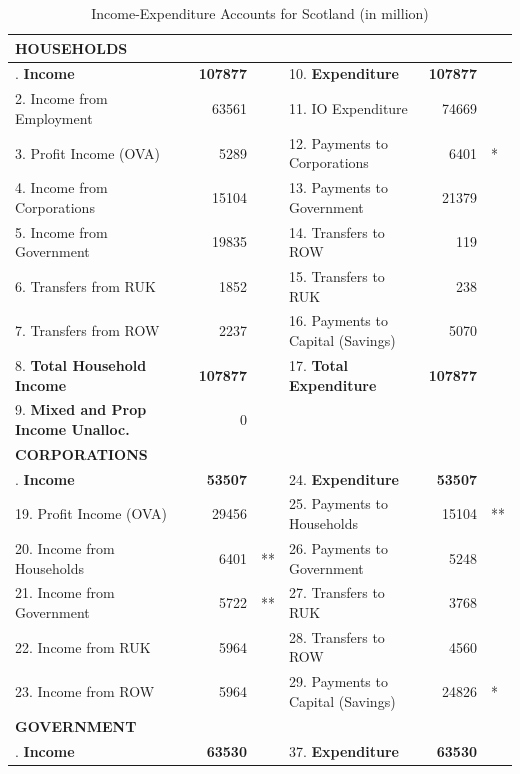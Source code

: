 \begin{table}[H] \caption{Income-Expenditure Accounts for Scotland (in \textsterling million)}
\bigskip \begin{scriptsize} \begin{centering} \begin{spacing}{1.2}
    \begin{tabular}{lrllrl}
          \toprule
    \textbf{HOUSEHOLDS} \bigstrut\\
   \hline  
\bigstrut[t]    1. \textbf{Income} & \textbf{107877} & & 10. \textbf{Expenditure} & \textbf{107877} & \\
    2. Income from Employment & 63561  &   & 11. IO Expenditure & 74669 & \\
    3. Profit Income (OVA) & 5289 & & 12. Payments to Corporations & 6401 &* \\
    4. Income from Corporations & 15104 & & 13. Payments to Government & 21379 & \\
    5. Income from Government & 19835 & & 14. Transfers to ROW & 119 & \\
    6. Transfers from RUK & 1852 & & 15. Transfers to RUK & 238 & \\
    7. Transfers from ROW & 2237 & & 16. Payments to Capital (Savings) & 5070 &\\
    8. \textbf{Total Household Income} & \textbf{107877} & & 17. \textbf{Total Expenditure} & \textbf{107877} & \\
    9. \textbf{Mixed and Prop Income Unalloc.} & 0 & \bigstrut[b]\\
    \hline
\bigstrut[t]    \textbf{CORPORATIONS} \bigstrut\\
    \hline
\bigstrut[t] 18. \textbf{Income} & \textbf{53507}  &   & 24. \textbf{Expenditure} & \textbf{53507} & \\
       19. Profit Income (OVA) & 29456 & & 25. Payments to Households & 15104 &** \\
       20. Income from Households & 6401 &** & 26. Payments to Government & 5248 & \\
       21. Income from Government & 5722 &** & 27. Transfers to RUK & 3768 & \\
       22. Income from RUK & 5964 & & 28. Transfers to ROW & 4560 & \\
       23. Income from ROW & 5964 & & 29. Payments to Capital (Savings) & 24826 &* \\
    \hline
    \textbf{GOVERNMENT} \bigstrut\\
    \hline
\bigstrut[t]       30. \textbf{Income} & \textbf{63530}  &   & 37. \textbf{Expenditure} & \textbf{63530} & \\

\end{tabular}
\end{spacing}
\end{centering}
\end{scriptsize}
\end{table}
